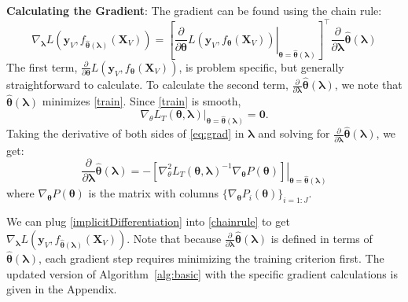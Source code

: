 \documentclass{statsoc}
\begin{document}
\noindent
\textbf{Calculating the Gradient}:
The gradient can be found using the chain rule:
\begin{equation}
\nabla_{\boldsymbol{\lambda}} L \left( \boldsymbol{y}_V, f_{\hat{\boldsymbol \theta}(\boldsymbol{\lambda})}(\boldsymbol{X}_V) \right ) = 
\left [
\left . \frac{\partial}{\partial \boldsymbol \theta} L ( \boldsymbol{y}_V, f_{\boldsymbol \theta}(\boldsymbol{X}_V)) \right |_{\boldsymbol \theta=\hat{\boldsymbol \theta}(\boldsymbol \lambda)}
\right ]^\top 
\frac{\partial}{\partial \boldsymbol{\lambda}} \hat{\boldsymbol \theta}(\boldsymbol{\lambda})
\label{chainrule}
\end{equation}
The first term, $\frac{\partial}{\partial \boldsymbol \theta} L ( \boldsymbol{y}_V, f_{\boldsymbol \theta}(\boldsymbol{X}_V))$, is problem specific, but generally straightforward to calculate. To calculate the second term, $\frac{\partial}{\partial \boldsymbol{\lambda}} \hat{\boldsymbol \theta}(\boldsymbol{\lambda})$, we note that $\hat{\boldsymbol \theta}(\boldsymbol{\lambda})$ minimizes \eqref{train}. Since \eqref{train} is smooth,
\begin{equation}
\nabla_\theta 
L_T(\boldsymbol \theta, \boldsymbol{\lambda})
|_{\boldsymbol \theta = \hat {\boldsymbol \theta}(\boldsymbol{\lambda})}
= \boldsymbol{0}.
\label{eq:grad}
\end{equation}
Taking the derivative of both sides of \eqref{eq:grad} in $\boldsymbol{\lambda}$ and solving for $\frac{\partial}{\partial \boldsymbol{\lambda}} \hat{\boldsymbol \theta}(\boldsymbol{\lambda})$, we get:
\begin{equation}
\frac{\partial}{\partial \boldsymbol{\lambda}} \hat{\boldsymbol \theta}(\boldsymbol{\lambda}) = 
- \left . \left [
 \nabla_\theta^2 L_T (\boldsymbol \theta, \boldsymbol{\lambda} )^{-1}
\nabla_{\boldsymbol \theta} P(\boldsymbol \theta)
\right ]
\right |_{\boldsymbol \theta = \hat {\boldsymbol \theta}(\boldsymbol{\lambda})}
\label{implicitDifferentiation}
\end{equation}
where $\nabla_{\boldsymbol \theta} P(\boldsymbol \theta)$ is the matrix with columns $\{\nabla_{\boldsymbol \theta} P_i(\boldsymbol \theta)\}_{i=1:J}$.

We can plug \eqref{implicitDifferentiation} into \eqref{chainrule} to get $\nabla_{\boldsymbol{\lambda}} L \left ( \boldsymbol{y}_V, f_{\hat{\boldsymbol \theta}(\boldsymbol{\lambda})}(\boldsymbol{X}_V) \right )$. Note that because $\frac{\partial}{\partial \boldsymbol{\lambda}} \hat{\boldsymbol \theta}(\boldsymbol{\lambda})$ is defined in terms of $\hat{\boldsymbol \theta}\left(\boldsymbol{\lambda}\right)$, each gradient step requires minimizing the training criterion first. The updated version of Algorithm~\ref{alg:basic} with the specific gradient calculations is given in the Appendix.
\end{document}
